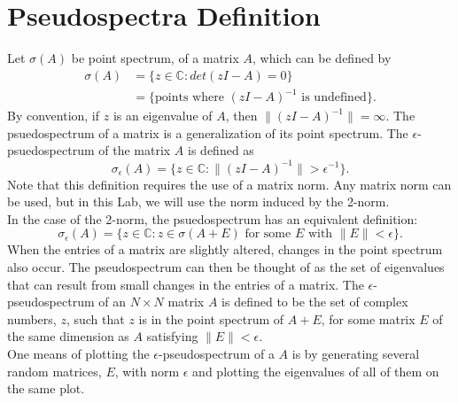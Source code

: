 \label{lab:pseudospectra}



\section*{Pseudospectra Definition}

Let $\sigma(A)$ be point spectrum, of a matrix $A$, which can be defined by
\begin{align}
	\sigma(A)&=\{z \in \mathbb{C}: det(zI-A)=0\}\\
	&=\{\text{points where }(zI-A)^{-1} \text{ is undefined}\}.
\end{align}
By convention, if $z$ is an eigenvalue of $A$, then $\|(zI-A)^{-1}\|=\infty$.
The psuedospectrum of a matrix is a generalization of its point spectrum. The $\epsilon$-psuedospectrum of the matrix $A$ is defined as
\begin{equation}
	\sigma_{\epsilon}(A)=\{z \in \mathbb{C}:\|(zI-A)^{-1}\| > \epsilon^{-1}\}.
\end{equation}
Note that this definition requires the use of a matrix norm. Any matrix norm can be used, but in this Lab, we will use the norm induced by the 2-norm.\\

In the case of the 2-norm, the psuedospectrum has an equivalent definition:
\begin{equation}
	\sigma_{\epsilon}(A)=\{z \in \mathbb{C}: z \in \sigma(A+E) \text{ for some $E$ with } \|E\|<\epsilon\}.
\end{equation}
When the entries of a matrix are slightly altered, changes in the point spectrum also occur. The pseudospectrum can then be thought of as the set of eigenvalues that can result from small changes in the entries of a matrix. The $\epsilon$-pseudospectrum of an $N\times N$ matrix $A$ is defined to be the set of complex numbers, $z$, such that $z$ is in the point spectrum of $A+E$, for some matrix $E$ of the same dimension as $A$ satisfying $\lVert E \rVert < \epsilon$.\\


One means of plotting the $\epsilon$-pseudospectrum of a $A$ is by generating several random matrices, $E$, with norm $\epsilon$ and plotting the eigenvalues of all of them on the same plot.\\


